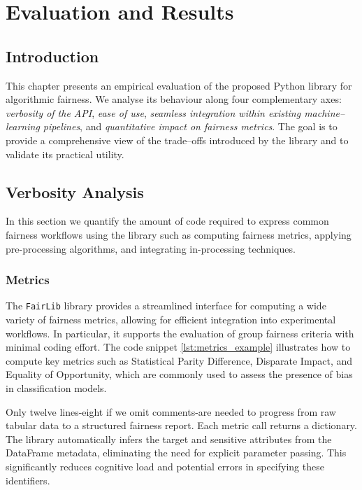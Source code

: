 \documentclass[12pt,a4paper,openright,twoside]{book}
\begin{document}
\chapter{Evaluation and Results}

\section{Introduction}
This chapter presents an empirical evaluation of the proposed Python library for algorithmic fairness. We analyse its behaviour along four complementary axes: \emph{verbosity of the API}, \emph{ease of use}, \emph{seamless integration within existing machine--learning pipelines}, and \emph{quantitative impact on fairness metrics}. The goal is to provide a comprehensive view of the trade--offs introduced by the library and to validate its practical utility.

\section{Verbosity Analysis}
In this section we quantify the amount of code required to express common fairness workflows using the library such as computing fairness metrics, applying pre-processing algorithms, and integrating in-processing techniques. 


\subsection{Metrics}
The \texttt{FairLib} library provides a streamlined interface for computing a wide variety of fairness metrics, allowing for efficient integration into experimental workflows. In particular, it supports the evaluation of group fairness criteria with minimal coding effort. The code snippet \ref{lst:metrics_example} illustrates how to compute key metrics such as Statistical Parity Difference, Disparate Impact, and Equality of Opportunity, which are commonly used to assess the presence of bias in classification models.



Only twelve lines-eight if we omit comments-are needed to progress from raw tabular data to a structured fairness report. Each metric call returns a dictionary. The library automatically infers the target and sensitive attributes from the DataFrame metadata, eliminating the need for explicit parameter passing. This significantly reduces cognitive load and potential errors in specifying these identifiers.
\end{document}
